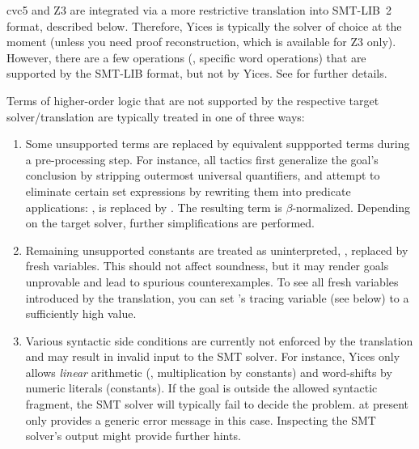 cvc5 and Z3 are integrated via a more restrictive translation into
SMT-LIB~2 format, described below.  Therefore, Yices is typically the
solver of choice at the moment (unless you need proof reconstruction,
which is available for Z3 only).  However, there are a few operations
(\eg, specific word operations) that are supported by the SMT-LIB
format, but not by Yices.  See  for further details.

Terms of higher-order logic that are not supported by the respective
target solver/\allowbreak translation are typically treated in one of
three ways:
\begin{enumerate}
\item Some unsupported terms are replaced by equivalent suppported
  terms during a pre-processing step.  For instance, all tactics first
  generalize the goal's conclusion by stripping outermost universal
  quantifiers, and attempt to eliminate certain set expressions by
  rewriting them into predicate applications: \eg,  is replaced by .  The resulting term is
  $\beta$-normalized.  Depending on the target solver, further
  simplifications are performed.
\item Remaining unsupported constants are treated as uninterpreted,
  \ie, replaced by fresh variables.  This should not affect soundness,
  but it may render goals unprovable and lead to spurious
  counterexamples.  To see all fresh variables introduced by the
  translation, you can set 's tracing variable (see
  below) to a sufficiently high value.
\item Various syntactic side conditions are currently not enforced by
  the translation and may result in invalid input to the SMT solver.
  For instance, Yices only allows \emph{linear} arithmetic (\ie,
  multiplication by constants) and word-shifts by numeric literals
  (constants).  If the goal is outside the allowed syntactic fragment,
  the SMT solver will typically fail to decide the problem.
   at present only provides a generic error message in
  this case.  Inspecting the SMT solver's output might provide further
  hints.
\end{enumerate}

